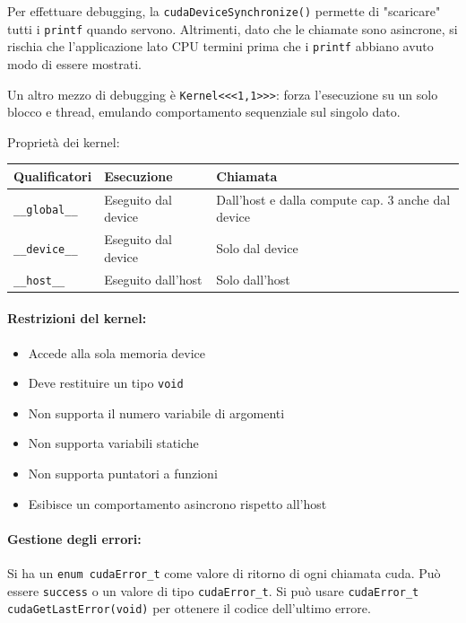 Per effettuare debugging, la \texttt{cudaDeviceSynchronize()} permette di "scaricare" tutti i \texttt{printf} quando servono. Altrimenti, dato che le chiamate sono asincrone, si rischia che l'applicazione lato CPU termini prima che i \texttt{printf} abbiano avuto modo di essere mostrati.

Un altro mezzo di debugging è \texttt{Kernel<<<1,1>>>}: forza l'esecuzione su un solo blocco e thread, emulando comportamento sequenziale sul singolo dato.

Proprietà dei kernel: 
\begin{center}
	\begin{tabular}{| l | l | p{4cm} |}
		\hline
		\textbf{Qualificatori} & \textbf{Esecuzione} & \textbf{Chiamata} \\
		\hline
		\texttt{\_\_global\_\_} & Eseguito dal device & Dall’host e dalla compute cap. 3 anche dal device \\
		\hline
		\texttt{\_\_device\_\_} & Eseguito dal device & Solo dal device \\
		\hline
		\texttt{\_\_host\_\_} & Eseguito dall’host & Solo dall’host \\
		\hline
	\end{tabular}
\end{center}

\paragraph{Restrizioni del kernel:}
\begin{itemize}
	\item Accede alla sola memoria device
	
	\item Deve restituire un tipo \texttt{void}
	
	\item Non supporta il numero variabile di argomenti
	
	\item Non supporta variabili statiche
	
	\item Non supporta puntatori a funzioni
	
	\item Esibisce un comportamento asincrono rispetto all'host
\end{itemize}

\paragraph{Gestione degli errori:} Si ha un \texttt{enum cudaError\_t} come valore di ritorno di ogni chiamata cuda. Può essere \texttt{success} o un valore di tipo \texttt{cudaError\_t}. Si può usare \texttt{cudaError\_t cudaGetLastError(void)} per ottenere il codice dell'ultimo errore.

